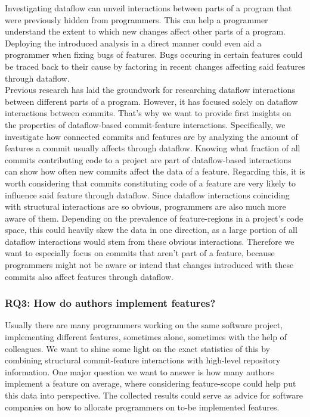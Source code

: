 Investigating dataflow can unveil interactions between parts of a program that were previously hidden from programmers.
This can help a programmer understand the extent to which new changes affect other parts of a program.
Deploying the introduced analysis in a direct manner could even aid a programmer when fixing bugs of features.
Bugs occuring in certain features could be traced back to their cause by factoring in recent changes affecting said features through dataflow. \\
Previous research has laid the groundwork for researching dataflow interactions between different parts of a program.
However, it has focused solely on dataflow interactions between commits.
That's why we want to provide first insights on the properties of dataflow-based commit-feature interactions.
Specifically, we investigate how connected commits and features are by analyzing the amount of features a commit usually affects through dataflow.
Knowing what fraction of all commits contributing code to a project are part of dataflow-based interactions can show how often new commits affect the data of a feature. 
Regarding this, it is worth considering that commits constituting code of a feature are very likely to influence said feature through dataflow.
Since dataflow interactions coinciding with structural interactions are so obvious, programmers are also much more aware of them. 
Depending on the prevalence of feature-regions in a project's code space, this could heavily skew the data in one direction, as a large portion of all dataflow interactions would stem from these obvious interactions. 
Therefore we want to especially focus on commits that aren't part of a feature, because programmers might not be aware or intend that changes introduced with these commits also affect features through dataflow. 

\subsubsection*{\textbf{RQ3: How do authors implement features?}}

Usually there are many programmers working on the same software project, implementing different features, sometimes alone, sometimes with the help of colleagues.
We want to shine some light on the exact statistics of this by combining structural commit-feature interactions with high-level repository information.
One major question we want to answer is how many authors implement a feature on average, where considering feature-scope could help put this data into perspective.
The collected results could serve as advice for software companies on how to allocate programmers on to-be implemented features. 

